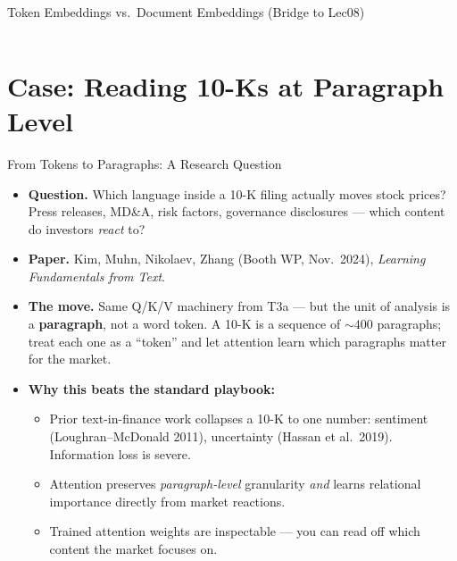 \begin{frame}{Token Embeddings vs.\ Document Embeddings (Bridge to Lec08)}
\begin{columns}[T]
\end{columns}
\end{frame}

\section{Case: Reading 10-Ks at Paragraph Level}

\begin{frame}{From Tokens to Paragraphs: A Research Question}
\begin{itemize}
\item \textbf{Question.} Which language inside a 10-K filing actually moves stock prices? Press releases, MD\&A, risk factors, governance disclosures --- which content do investors \emph{react} to?

\medskip
\item \textbf{Paper.} Kim, Muhn, Nikolaev, Zhang (Booth WP, Nov.\ 2024), \emph{Learning Fundamentals from Text}.

\medskip
\item \textbf{The move.} Same Q/K/V machinery from T3a --- but the unit of analysis is a \textbf{paragraph}, not a word token. A 10-K is a sequence of $\sim 400$ paragraphs; treat each one as a ``token'' and let attention learn which paragraphs matter for the market.

\medskip
\item \textbf{Why this beats the standard playbook:}
\begin{itemize}
    \item Prior text-in-finance work collapses a 10-K to one number: sentiment (Loughran--McDonald 2011), uncertainty (Hassan et al.\ 2019). Information loss is severe.
    \item Attention preserves \emph{paragraph-level} granularity \emph{and} learns relational importance directly from market reactions.
    \item Trained attention weights are inspectable --- you can read off which content the market focuses on.
\end{itemize}
\end{itemize}
\end{frame}

